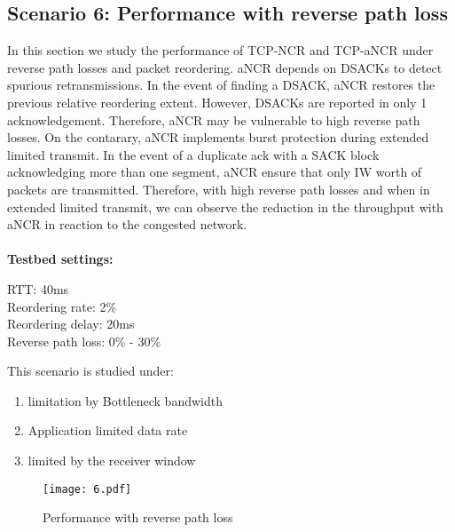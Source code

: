 \subsection{Scenario 6: Performance with reverse path loss\label{ss:is6}}
In this section we study the performance of TCP-NCR and TCP-aNCR under reverse path losses and packet reordering. aNCR depends on DSACKs to detect spurious retransmissions. In the event of finding a DSACK, aNCR restores the previous relative reordering extent. However, DSACKs are reported in only 1 acknowledgement. Therefore, aNCR may be vulnerable to high reverse path losses.
On the contarary, aNCR implements burst protection during extended limited transmit. In the event of a duplicate ack with a SACK block acknowledging more than one segment, aNCR ensure that only IW worth of packets are transmitted. Therefore, with high reverse path losses and when in extended limited transmit, we can observe the reduction in the throughput with aNCR in reaction to the congested network.
\\
\\
\textbf{Testbed settings:}
\begin{tabbing}
\enspace RTT: 40ms \\
\enspace Reordering rate: 2\% \\
\enspace Reordering delay: 20ms \\
\enspace Reverse path loss: 0\% - 30\%
\end{tabbing}
This scenario is studied under:
\begin{enumerate}
    \item limitation by Bottleneck bandwidth
    \item Application limited data rate
    \item limited by the receiver window
\end{enumerate}

\begin{figure}
    \centering
    \texttt{[image: 6.pdf]}\\
    \caption{Performance with reverse path loss}\label{fig:6_i}
\end{figure}

\
